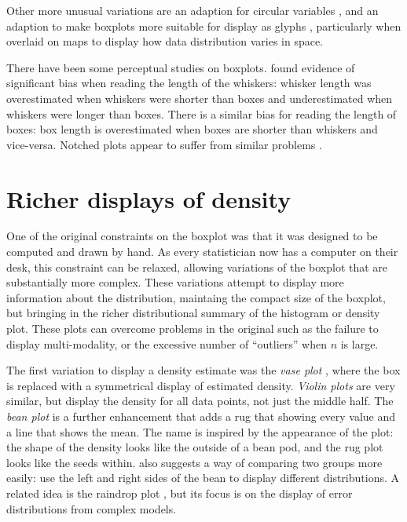 \documentclass[oneside]{article}
\begin{document}
Other more unusual variations are an adaption for circular variables \citep{abuzaid:2011}, and an adaption to make boxplots more suitable for display as glyphs \citet{carr:1998}, particularly when overlaid on maps to display how data distribution varies in space.

There have been some perceptual studies on boxplots. \citet{behrens:1990} found evidence of significant bias when reading the length of the whiskers: whisker length was overestimated when whiskers were shorter than boxes and underestimated when whiskers were longer than boxes. There is a similar bias for reading the length of boxes: box length is overestimated when boxes are shorter than whiskers and vice-versa. Notched plots appear to suffer from similar problems \citep{wells:1996}.

\section{Richer displays of density}
\label{sec:density}

One of the original constraints on the boxplot was that it was designed to be computed and drawn by hand. As every statistician now has a computer on their desk, this constraint can be relaxed, allowing variations of the boxplot that are substantially more complex. These variations attempt to display more information about the distribution, maintaing the compact size of the boxplot, but bringing in the richer distributional summary of the histogram or density plot. These plots can overcome problems in the original such as the failure to display multi-modality, or the excessive number of ``outliers'' when $n$ is large.

The first variation to display a density estimate was the \emph{vase plot} \citep{benjamini:1988}, where the box is replaced with a symmetrical display of estimated density. \emph{Violin plots} \citep{hintze:1998} are very similar, but display the density for all data points, not just the middle half. The \emph{bean plot} \citep{kampstra:2008} is a further enhancement that adds a rug that showing every value and a line that shows the mean. The name is inspired by the appearance of the plot: the shape of the density looks like the outside of a bean pod, and the rug plot looks like the seeds within. \citet{kampstra:2008} also suggests a way of comparing two groups more easily: use the left and right sides of the bean to display different distributions. A related idea is the raindrop plot \citep{barrowman:2003}, but its focus is on the display of error distributions from complex models.
\end{document}
